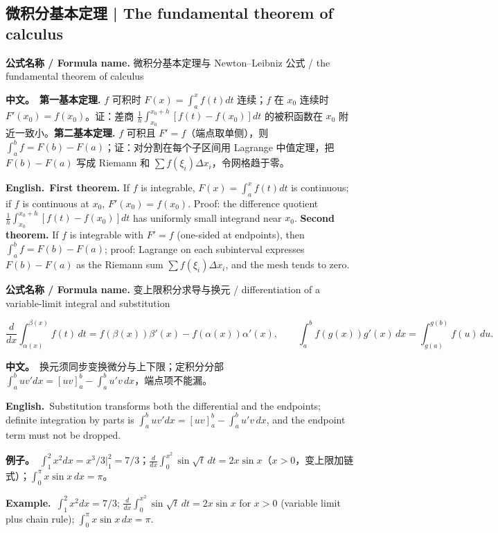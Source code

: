 \documentclass[UTF8,11pt,a4paper]{ctexart}
\newcommand{\BOTH}[2]{\par\noindent\textbf{中文。}\ #1\par\noindent\textbf{English.}\ #2\par}
\newcommand{\EX}[2]{\par\noindent\textbf{例子。}\ #1\par\noindent\textbf{Example.}\ #2\par}
\newcommand{\FORMULA}[2]{\par\noindent\textbf{公式名称 / Formula name.} #1 / #2\par}
\begin{document}
\subsection{微积分基本定理 | The fundamental theorem of calculus}
\FORMULA{微积分基本定理与 Newton--Leibniz 公式}{the fundamental theorem of calculus}
\BOTH{\textbf{第一基本定理.} $f$ 可积时 $F(x)=\int_a^xf(t)dt$ 连续；$f$ 在 $x_0$ 连续时 $F'(x_0)=f(x_0)$。证：差商 $\frac1h\int_{x_0}^{x_0+h}[f(t)-f(x_0)]dt$ 的被积函数在 $x_0$ 附近一致小。\textbf{第二基本定理.} $f$ 可积且 $F'=f$（端点取单侧），则 $\int_a^bf=F(b)-F(a)$；证：对分割在每个子区间用 Lagrange 中值定理，把 $F(b)-F(a)$ 写成 Riemann 和 $\sum f(\xi_i)\Delta x_i$，令网格趋于零。}{\textbf{First theorem.} If $f$ is integrable, $F(x)=\int_a^xf(t)dt$ is continuous; if $f$ is continuous at $x_0$, $F'(x_0)=f(x_0)$. Proof: the difference quotient $\frac1h\int_{x_0}^{x_0+h}[f(t)-f(x_0)]dt$ has uniformly small integrand near $x_0$. \textbf{Second theorem.} If $f$ is integrable with $F'=f$ (one-sided at endpoints), then $\int_a^bf=F(b)-F(a)$; proof: Lagrange on each subinterval expresses $F(b)-F(a)$ as the Riemann sum $\sum f(\xi_i)\Delta x_i$, and the mesh tends to zero.}
\FORMULA{变上限积分求导与换元}{differentiation of a variable-limit integral and substitution}
\[
\frac{d}{dx}\int_{\alpha(x)}^{\beta(x)}f(t)\,dt=f(\beta(x))\beta'(x)-f(\alpha(x))\alpha'(x),\qquad
\int_a^b f(g(x))g'(x)\,dx=\int_{g(a)}^{g(b)}f(u)\,du .
\]
\BOTH{换元须同步变换微分与上下限；定积分分部 $\int_a^bu v'dx=[uv]_a^b-\int_a^bu'v\,dx$，端点项不能漏。}{Substitution transforms both the differential and the endpoints; definite integration by parts is $\int_a^bu v'dx=[uv]_a^b-\int_a^bu'v\,dx$, and the endpoint term must not be dropped.}
\EX{$\int_1^2x^2dx=x^3/3\big|_1^2=7/3$；$\frac{d}{dx}\int_0^{x^2}\sin\sqrt t\,dt=2x\sin x$（$x>0$，变上限加链式）；$\int_0^{\pi}x\sin x\,dx=\pi$。}{$\int_1^2x^2dx=7/3$; $\frac{d}{dx}\int_0^{x^2}\sin\sqrt t\,dt=2x\sin x$ for $x>0$ (variable limit plus chain rule); $\int_0^{\pi}x\sin x\,dx=\pi$.}
\end{document}
